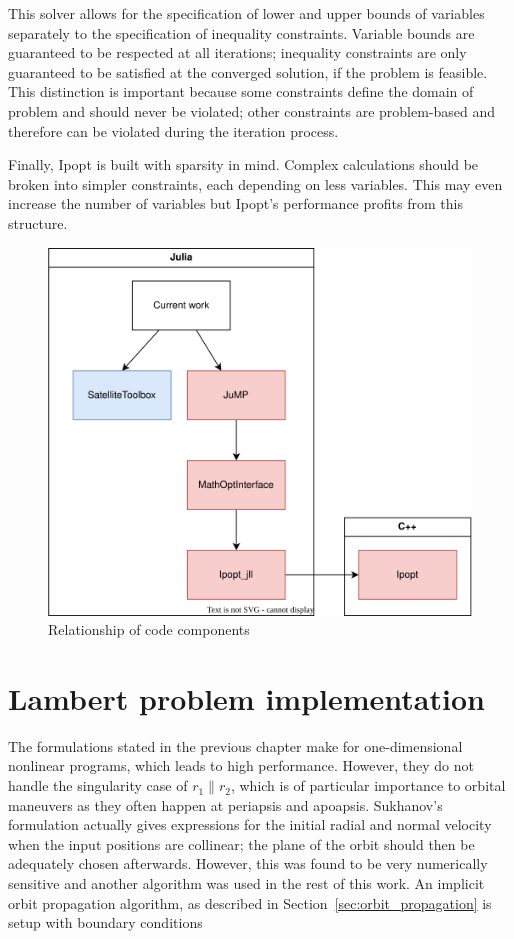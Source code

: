 This solver allows for the specification of lower and upper bounds of variables separately to the specification of inequality constraints. Variable bounds are guaranteed to be respected at all iterations; inequality constraints are only guaranteed to be satisfied at the converged solution, if the problem is feasible. This distinction is important because some constraints define the domain of problem and should never be violated; other constraints are problem-based and therefore can be violated during the iteration process.

Finally, Ipopt is built with sparsity in mind. Complex calculations should be broken into simpler constraints, each depending on less variables. This may even increase the number of variables but Ipopt's performance profits from this structure.

\begin{figure}[htbp]
    \centering
        \includegraphics[width=\textwidth]{img/techstack.png}
    \caption{Relationship of code components}
    \label{fig:tech_stack}
\end{figure}

\section{Lambert problem implementation}

The formulations stated in the previous chapter make for one-dimensional nonlinear programs, which leads to high performance. However, they do not handle the singularity case of \(r_1 \parallel r_2\), which is of particular importance to orbital maneuvers as they often happen at periapsis and apoapsis. Sukhanov's formulation actually gives expressions for the initial radial and normal velocity when the input positions are collinear; the plane of the orbit should then be adequately chosen afterwards. However, this was found to be very numerically sensitive and another algorithm was used in the rest of this work. An implicit orbit propagation algorithm, as described in Section~\ref{sec:orbit_propagation} is setup with boundary conditions

